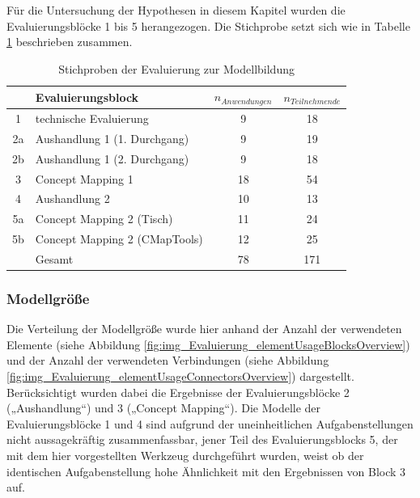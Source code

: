 Für die Untersuchung der Hypothesen in diesem Kapitel wurden die Evaluierungsblöcke 1 bis 5 herangezogen. Die Stichprobe setzt sich wie in Tabelle \ref{tab:stichprobe_modell} beschrieben zusammen.

\begin{table}[htbp]
	\centering
	\caption{Stichproben der Evaluierung zur Modellbildung}

	\begin{tabular}{| c | l || c | c |}
	\hline
		& Evaluierungsblock & $n_{Anwendungen}$ & $n_{Teilnehmende}$ \\ \hline
		1 & technische Evaluierung		  &  9 & 18 \\
		2a & Aushandlung 1 (1. Durchgang)  &  9 & 19 \\
		2b & Aushandlung 1 (2. Durchgang)  &  9 & 18 \\
		3 & Concept Mapping 1			  & 18 & 54 \\
		4 & Aushandlung 2				  & 10 & 13 \\
		5a & Concept Mapping 2 (Tisch)     & 11 & 24 \\
		5b & Concept Mapping 2 (CMapTools) & 12 & 25 \\ \hline
		& Gesamt						  & 78 & 171 \\ \hline
\end{tabular}
	\label{tab:stichprobe_modell}
\end{table}

\subsubsection{Modellgröße} %
\label{ssub:modellgröße}

Die Verteilung der Modellgröße wurde hier anhand der Anzahl der verwendeten Elemente (siehe Abbildung \ref{fig:img_Evaluierung_elementUsageBlocksOverview}) und der Anzahl der verwendeten Verbindungen (siehe Abbildung \ref{fig:img_Evaluierung_elementUsageConnectorsOverview}) dargestellt. Berücksichtigt wurden dabei die Ergebnisse der Evaluierungsblöcke 2 („Aushandlung“) und 3 („Concept Mapping“). Die Modelle der Evaluierungsblöcke 1 und 4 sind aufgrund der uneinheitlichen Aufgabenstellungen nicht aussagekräftig zusammenfassbar, jener Teil des Evaluierungsblocks 5, der mit dem hier vorgestellten Werkzeug durchgeführt wurden, weist ob der identischen Aufgabenstellung hohe Ähnlichkeit mit den Ergebnissen von Block 3 auf.

